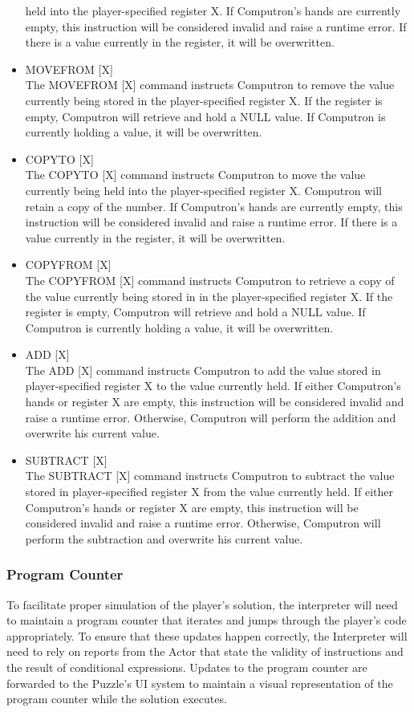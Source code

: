 \begin{itemize}
	held into the player-specified register X. If Computron's hands are currently empty, this 
	instruction will be considered invalid and raise a runtime error. If there is a value currently in 
	the register, it will be overwritten.
	\item MOVEFROM [X]\\
	The MOVEFROM [X] command instructs Computron to remove the value currently being 
	stored in the player-specified register X. If the register is empty, Computron will retrieve 
	and hold a NULL value. If Computron is currently holding a value, it will be overwritten.
	\item COPYTO [X]\\
	The COPYTO [X] command instructs Computron to move the value currently being held 
	into the player-specified register X. Computron will retain a copy of the number. If 
	Computron's hands are currently empty, this instruction will be considered invalid and raise a 
	runtime error. If there is a value currently in the register, it will be overwritten.
	\item COPYFROM [X]\\
	The COPYFROM [X] command instructs Computron to retrieve a copy of the value currently 
	being stored in in the player-specified register X. If the register is empty, Computron will 
	retrieve and hold a NULL value. If Computron is currently holding a value, it will be overwritten.
	\item ADD [X]\\
	The ADD [X] command instructs Computron to add the value stored in player-specified 
	register X to the value currently held. If either Computron's hands or register X are empty, this 
	instruction will be considered invalid and raise a runtime error. Otherwise, Computron will 
	perform the addition and overwrite his current value.\\
	\item SUBTRACT [X]\\
	The SUBTRACT [X] command instructs Computron to subtract the value stored in 
	player-specified register X from the value currently held. If either Computron's hands or 
	register X are empty, this instruction will be considered invalid and raise a runtime error. 
	Otherwise, Computron will perform the subtraction and overwrite his current value.
\end{itemize}

\subsubsection{Program Counter}
To facilitate proper simulation of the player's solution, the interpreter will need to maintain 
a program counter that iterates and jumps through the player's code appropriately. To 
ensure that these updates happen correctly, the Interpreter will need to rely on reports 
from the Actor that state the validity of instructions and the result of conditional expressions.
Updates to the program counter are forwarded to the Puzzle's UI system to maintain a 
visual representation of the program counter while the solution executes.

